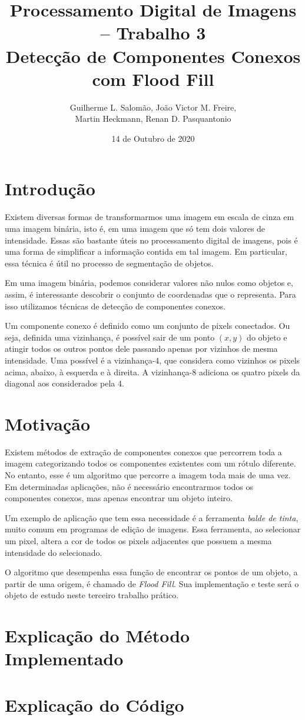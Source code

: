 \documentclass[12pt,a4paper]{article}
\title{Processamento Digital de Imagens – Trabalho 3\\Detecção de Componentes Conexos com Flood Fill}
\author{Guilherme L. Salomão, João Victor M. Freire, \\Martin Heckmann, Renan D. Pasquantonio }
\date{14 de Outubro de 2020}
\begin{document}
\maketitle

\section{Introdução}
Existem diversas formas de transformarmos uma imagem em escala de cinza em uma imagem binária, isto é, em uma imagem que só tem dois valores de intensidade. Essas são bastante úteis no processamento digital de imagens, pois é uma forma de simplificar a informação contida em tal imagem. Em particular, essa técnica é útil no processo de segmentação de objetos.

Em uma imagem binária, podemos considerar valores não nulos como objetos e, assim, é interessante descobrir o conjunto de coordenadas que o representa. Para isso utilizamos técnicas de detecção de componentes conexos.

Um componente conexo é definido como um conjunto de pixels conectados. Ou seja, definida uma vizinhança, é possível sair de um ponto $(x, y)$ do objeto e atingir todos os outros pontos dele passando apenas por vizinhos de mesma intensidade. Uma possível é a vizinhança-4, que considera como vizinhos os pixels acima, abaixo, à esquerda e à direita. A vizinhança-8 adiciona os quatro pixels da diagonal aos considerados pela 4.

\section{Motivação}

Existem métodos de extração de componentes conexos que percorrem toda a imagem categorizando todos os componentes existentes com um rótulo diferente. No entanto, esse é um algoritmo que percorre a imagem toda mais de uma vez. Em determinadas aplicações, não é necessário encontrarmos todos os componentes conexos, mas apenas encontrar um objeto inteiro.

Um exemplo de aplicação que tem essa necessidade é a ferramenta \textit{balde de tinta}, muito comum em programas de edição de imagens. Essa ferramenta, ao selecionar um pixel, altera a cor de todos os pixels adjacentes que possuem a mesma intensidade do selecionado.

O algoritmo que desempenha essa função de encontrar os pontos de um objeto, a partir de uma origem, é chamado de \textit{Flood Fill}. Sua implementação e teste será o objeto de estudo neste terceiro trabalho prático.


\section{Explicação do Método Implementado}

\section{Explicação do Código}


\nocite{comin2020}
\nocite{wiki01}



\end{document}
